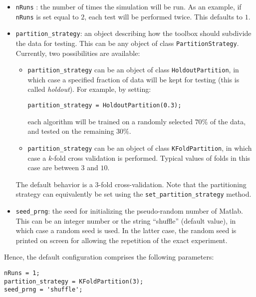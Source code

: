 \begin{itemize}
\item \verb;nRuns; : the number of times the simulation will be run. As an example, if \verb;nRuns; is set equal to $2$, each test will be performed twice. This defaults to $1$.
\item \verb|partition_strategy|: an object describing how the toolbox should subdivide the data for testing. This can be any object of class \verb|PartitionStrategy|. Currently, two possibilities are available:

\begin{itemize}
\item \verb|partition_strategy| can be an object of class \verb|HoldoutPartition|, in which case a specified fraction of data will be kept for testing (this is called \textit{holdout}). For example, by setting:

\begin{lstlisting}
partition_strategy = HoldoutPartition(0.3);
\end{lstlisting}

each algorithm will be trained on a randomly selected $70\%$ of the data, and tested on the remaining $30\%$.

\item \verb|partition_strategy| can be an object of class \verb|KFoldPartition|, in which case a $k$-fold cross validation is performed. Typical values of folds in this case are between $3$ and $10$.

\end{itemize}


The default behavior is a $3$-fold cross-validation. Note that the partitioning strategy can equivalently be set using the \verb|set_partition_strategy| method.

\item \verb|seed_prng|: the seed for initializing the pseudo-random number  of Matlab. This can be an integer number or the string ``shuffle'' (default value), in which case a random seed is used. In the latter case, the random seed is printed on screen for allowing the repetition of the exact experiment.
\end{itemize}

\noindent Hence, the default configuration comprises the following parameters:

\begin{lstlisting}
nRuns = 1;
partition_strategy = KFoldPartition(3);
seed_prng = 'shuffle';
\end{lstlisting}

